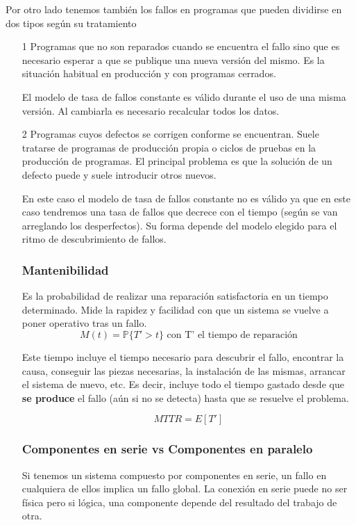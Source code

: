 Por otro lado tenemos también los fallos en programas que pueden dividirse en dos tipos según su tratamiento
\begin{enumerate}
\item[1] Programas que no son reparados cuando se encuentra el fallo sino que es necesario esperar a que se publique una nueva versión del mismo. Es la situación habitual en producción y con programas cerrados.

El modelo de tasa de fallos constante es válido durante el uso de una misma versión. Al cambiarla es necesario recalcular todos los datos.

\item[2] Programas cuyos defectos se corrigen conforme se encuentran. Suele tratarse de programas de producción propia o ciclos de pruebas en la producción de programas. El principal problema es que la solución de un defecto puede y suele introducir otros nuevos.

En este caso el modelo de tasa de fallos constante no es válido ya que en este caso tendremos una tasa de fallos que decrece con el tiempo (según se van arreglando los desperfectos). Su forma depende del modelo elegido para el ritmo de descubrimiento de fallos.

\subsubsection{Mantenibilidad}
Es la probabilidad de realizar una reparación satisfactoria en un tiempo determinado. Mide la rapidez y facilidad con que un sistema se vuelve a poner operativo tras un fallo.
\[M(t)=\mathbb{P}\{T'> t\} \text{ con T' el tiempo de reparación}\]

Este tiempo incluye el tiempo necesario para descubrir el fallo, encontrar la causa, conseguir las piezas necesarias, la instalación de las mismas, arrancar el sistema de nuevo, etc. Es decir, incluye todo el tiempo gastado desde que \textbf{se produce} el fallo (aún si no se detecta) hasta que se resuelve el problema.

\[MTTR=E[T']\]

\subsubsection{Componentes en serie vs Componentes en paralelo}

Si tenemos un sistema compuesto por componentes en serie, un fallo en cualquiera de ellos implica un fallo global. La conexión en serie puede no ser física pero si lógica, una componente depende del resultado del trabajo de otra.


\end{enumerate}
